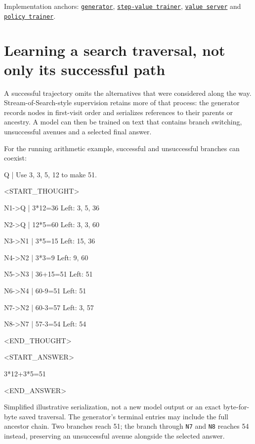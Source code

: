 \documentclass[11pt,letterpaper]{article}
\newcommand{\src}[2]{\href{https://github.com/RaychevAngel/classical_vs_contextual_search/blob/1a7fda10617d34ccd3a87c825cba71e4429de91a/#1}{\texttt{#2}}}
\newcommand{\smallnote}[1]{{\small\color{ink}#1}}
\begin{document}
\smallnote{Implementation anchors: \src{generate_data/mcts_generator.py}{generator}, \src{train/value_trainer.py}{step-value trainer}, \src{utils/deployer_value.py}{value server} and \src{train/policy_trainer.py}{policy trainer}.}

\section{Learning a search traversal, not only its successful path}
A successful trajectory omits the alternatives that were considered along the way. Stream-of-Search-style supervision retains more of that process: the generator records nodes in first-visit order and serializes references to their parents or ancestry. A model can then be trained on text that contains branch switching, unsuccessful avenues and a selected final answer.

\begin{samepage}
For the running arithmetic example, successful and unsuccessful branches can coexist:
\begin{center}
\begin{minipage}{0.94\linewidth}
\small\ttfamily
Q | Use 3, 3, 5, 12 to make 51.\par
<START\_THOUGHT>\par
N1->Q | 3*12=36 Left: 3, 5, 36\par
N2->Q | 12*5=60 Left: 3, 3, 60\par
N3->N1 | 3*5=15 Left: 15, 36\par
N4->N2 | 3*3=9 Left: 9, 60\par
N5->N3 | 36+15=51 Left: 51\par
N6->N4 | 60-9=51 Left: 51\par
N7->N2 | 60-3=57 Left: 3, 57\par
N8->N7 | 57-3=54 Left: 54\par
<END\_THOUGHT>\par
<START\_ANSWER>\par
3*12+3*5=51\par
<END\_ANSWER>
\end{minipage}
\end{center}
\smallnote{Simplified illustrative serialization, not a new model output or an exact byte-for-byte saved traversal. The generator's terminal entries may include the full ancestor chain. Two branches reach 51; the branch through \texttt{N7} and \texttt{N8} reaches 54 instead, preserving an unsuccessful avenue alongside the selected answer.}
\end{samepage}
\end{document}
